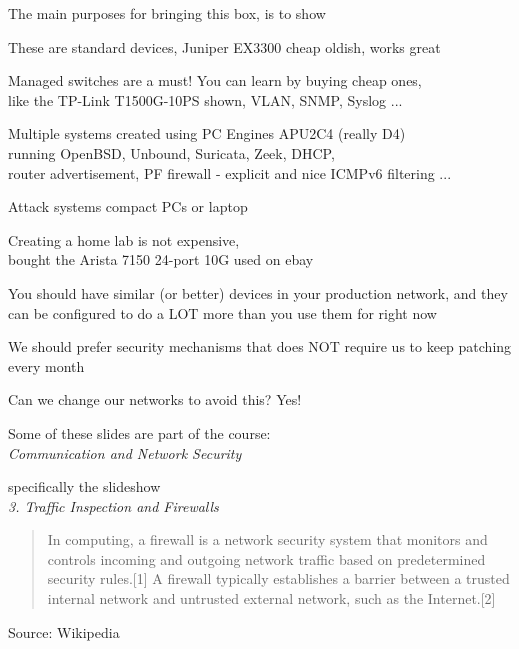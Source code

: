 \documentclass[Screen16to9,17pt]{foils}
\begin{document}
The main purposes for bringing this box, is to show
\begin{list2}
\item These are standard devices, Juniper EX3300 cheap oldish, works great
\item Managed switches are a must! You can learn by buying cheap ones,\\
like the TP-Link T1500G-10PS  shown, VLAN, SNMP, Syslog ...
\item Multiple systems created using PC Engines APU2C4 (really D4)\\
running OpenBSD, Unbound, Suricata, Zeek, DHCP, \\
router advertisement, PF firewall - explicit and nice ICMPv6 filtering ...
\item Attack systems compact PCs or laptop
\item Creating a home lab is not expensive, \\
bought the Arista 7150 24-port 10G used on ebay
\end{list2}

You should have similar (or better) devices in your production network, and they can be
configured to do a LOT more than you use them for right now




\begin{list2}
\item We should prefer security mechanisms that does NOT require us to keep patching every month
\item Can we change our networks to avoid this? Yes!
\end{list2}



Some of these slides are part of the course:\\
\emph{Communication and Network Security}

specifically the slideshow\\
\emph{3. Traffic Inspection and Firewalls}




\begin{quote}
In computing, a firewall is a network security system that monitors and controls incoming and outgoing network traffic based on predetermined security rules.[1] A firewall typically establishes a barrier between a trusted internal network and untrusted external network, such as the Internet.[2]
\end{quote}
Source: Wikipedia 
\end{document}
